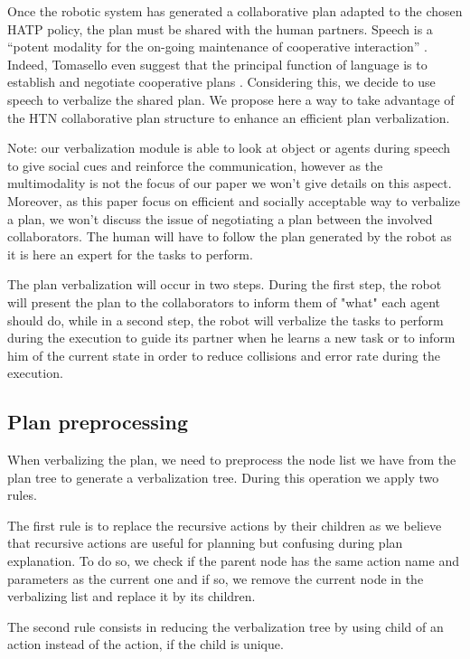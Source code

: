 \documentclass{llncs}
\begin{document}
Once the robotic system has generated a collaborative plan adapted to the chosen HATP policy, the plan must be shared with the human partners.
Speech is a ``potent modality for the on-going maintenance of cooperative interaction'' \cite{Lallee2013}. Indeed, Tomasello even suggest that the principal function of language is to establish and negotiate cooperative plans \cite{tomasello2005}.
Considering this, we decide to use speech to verbalize the shared plan. We propose here a way to take advantage of the HTN collaborative plan structure to enhance an efficient plan verbalization.

Note: our verbalization module is able to look at object or agents during speech to give social cues and reinforce the communication, however as the multimodality is not the focus of our paper we won't give details on this aspect. Moreover, as this paper focus on efficient and socially acceptable way to verbalize a plan, we won't discuss the issue of negotiating a plan between the involved collaborators. The human will have to follow the plan generated by the robot as it is here an expert for the tasks to perform.

The plan verbalization will occur in two steps.
During the first step, the robot will present the plan to the collaborators to inform them of "what" each agent should do, while in a second step, the robot will verbalize the tasks to perform during the execution to guide its partner when he learns a new task or to inform him of the current state in order to reduce collisions and error rate during the execution.


\subsection{Plan preprocessing}
\label{preprocess}
When verbalizing the plan, we need to preprocess the node list we have from the plan tree to generate a verbalization tree.
During this operation we apply two rules.

The first rule is to replace the recursive actions by their children as we believe that recursive actions are useful for planning but confusing during plan explanation. To do so, we check if the parent node has the same action name and parameters as the current one and if so, we remove the current node in the verbalizing list and replace it by its children.

The second rule consists in reducing the verbalization tree by using child of an action instead of the action, if the child is unique.
\end{document}
